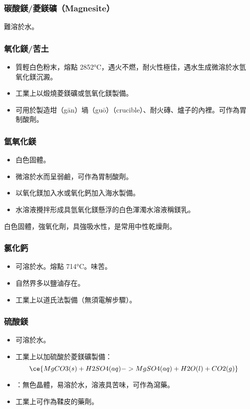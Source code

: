 \documentclass[a4paper,12pt]{report}
\begin{document}
\begin{itemize}
\begin{itemize}
\subsubsection{碳酸鎂/菱鎂礦（Magnesite）}
難溶於水。
\subsubsection{氧化鎂/苦土}
\begin{itemize}
\item 質輕白色粉末，熔點 2852°C，遇火不燃，耐火性極佳，遇水生成微溶於水氫氧化鎂沉澱。
\item 工業上以煅燒菱鎂礦或氫氧化鎂製備。
\item 可用於製造坩（gān）堝（guō）（crucible）、耐火磚、爐子的內裡。可作為胃制酸劑。
\end{itemize}
\subsubsection{氫氧化鎂}
\begin{itemize}
\item 白色固體。
\item 微溶於水而呈弱鹼，可作為胃制酸劑。
\item 以氧化鎂加入水或氧化鈣加入海水製備。
\item 水溶液攪拌形成具氫氧化鎂懸浮的白色渾濁水溶液稱鎂乳。
\end{itemize}
白色固體，強氧化劑，具強吸水性，是常用中性乾燥劑。
\subsubsection{氯化鈣}
\begin{itemize}
\item 可溶於水。熔點 714°C。味苦。
\item 自然界多以鹽滷存在。
\item 工業上以道氏法製備（無須電解步驟）。
\end{itemize}
\subsubsection{硫酸鎂}
\begin{itemize}
\item 可溶於水。
\item 工業上以加硫酸於菱鎂礦製備：
\[\ce{MgCO3(s) + H2SO4(aq) -> MgSO4(aq) + H2O(l) + CO2(g)}\]
\item {}：無色晶體，易溶於水，溶液具苦味，可作為瀉藥。
\item 工業上可作為鞣皮的藥劑。
\end{itemize}

\end{itemize}
\end{itemize}
\end{document}
